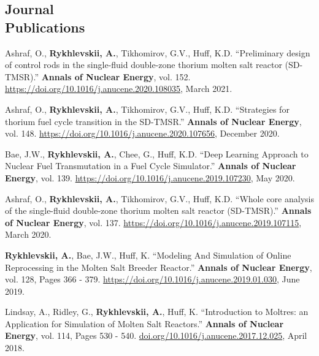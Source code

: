 \documentclass[margin,line]{resume}
\begin{document}
\begin{resume}
    \section{\mysidestyle Journal\\Publications}
      \begin{bibenum}
        \item Ashraf, O., \textbf{Rykhlevskii, A.}, Tikhomirov, G.V., Huff, 
      	K.D. ``Preliminary design of control rods in the single-fluid 
      	double-zone thorium molten salt reactor (SD-TMSR).''
      	\textbf{Annals of Nuclear Energy}, vol. 152. 
      	\url{https://doi.org/10.1016/j.anucene.2020.108035}, March 
      	2021.  	
	    \item Ashraf, O., \textbf{Rykhlevskii, A.}, Tikhomirov, G.V., Huff, 
		K.D. ``Strategies for thorium fuel cycle transition in the SD-TMSR.''
		\textbf{Annals of Nuclear Energy}, vol. 148. 
		\url{https://doi.org/10.1016/j.anucene.2020.107656}, December 
		2020.   	
 		\item Bae, J.W., \textbf{Rykhlevskii, A.}, Chee, G., Huff, K.D. ``Deep 
		 Learning Approach to Nuclear Fuel Transmutation in a Fuel Cycle 
		 Simulator.'' \textbf{Annals of Nuclear Energy}, vol. 139. 
		 \url{https://doi.org/10.1016/j.anucene.2019.107230}, May 2020.
	    \item Ashraf, O., \textbf{Rykhlevskii, A.}, Tikhomirov, G.V., Huff, 
		K.D. ``Whole core analysis of the single-fluid double-zone thorium 
		molten salt reactor (SD-TMSR).'' \textbf{Annals of Nuclear Energy}, 
		vol. 137. \url{https://doi.org/10.1016/j.anucene.2019.107115}, March 
		2020.
	    \item \textbf{Rykhlevskii, A.}, Bae, J.W., Huff, K. ``Modeling And 
	    Simulation of Online Reprocessing in the Molten Salt Breeder 
	    Reactor.'' \textbf{Annals of Nuclear Energy}, vol. 128, Pages 366 - 
	    379. \url{https://doi.org/10.1016/j.anucene.2019.01.030}, June 2019.
       \item Lindsay, A., Ridley, G., \textbf{Rykhlevskii, A.}, Huff, K. ``Introduction to 
               Moltres: an Application for Simulation of Molten Salt 
               Reactors.''  \textbf{Annals of Nuclear Energy}, vol. 114, Pages 
               530 - 540. \url{doi.org/10.1016/j.anucene.2017.12.025}, April 
               2018.
      \end{bibenum}
\vspace{2mm} %
	

\end{resume}
\end{document}
